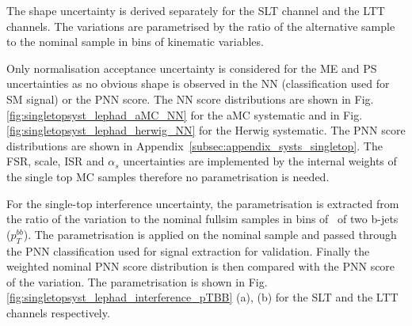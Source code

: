



  
The shape uncertainty is derived separately for the SLT channel and the LTT channels. The variations are parametrised by the 
ratio of the alternative sample to the nominal sample in bins of kinematic variables. 

Only normalisation acceptance uncertainty is considered for the ME and PS uncertainties as no obvious shape is observed in 
the NN (classification used for SM signal) or the PNN score. The NN score distributions are shown in Fig.\ref{fig:singletopsyst_lephad_aMC_NN} for the aMC systematic
and in Fig.\ref{fig:singletopsyst_lephad_herwig_NN} for the Herwig systematic.
The PNN score distributions are shown in Appendix~\ref{subsec:appendix_systs_singletop}. 
The FSR, scale, ISR and $\alpha_s$ uncertainties are 
implemented by the internal weights of the single top MC samples therefore no parametrisation is needed. 

For the single-top interference uncertainty, the parametrisation is extracted from the ratio of the variation to the nominal fullsim samples
in bins of \pt\ of two b-jets ($p_T^{bb}$). The parametrisation is applied on the nominal sample and passed through the PNN 
classification used for signal extraction for validation. Finally the weighted nominal PNN score distribution is then compared with the PNN 
score of the variation. The parametrisation is shown in 
Fig.\ref{fig:singletopsyst_lephad_interference_pTBB} (a), (b) for the SLT and the LTT channels respectively.

